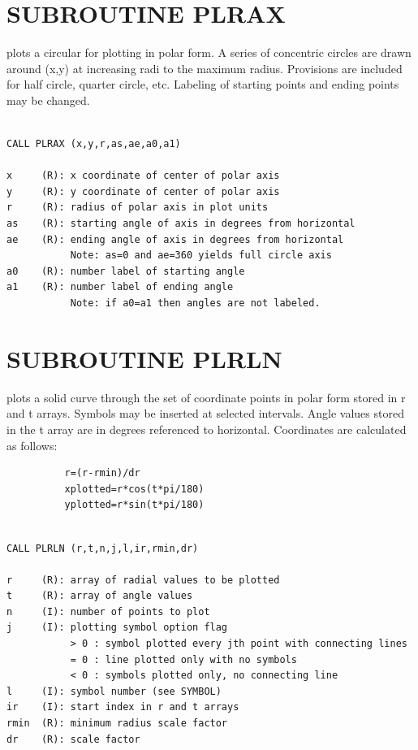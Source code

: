 \documentclass[11pt]{report}
\begin{document}
\section{SUBROUTINE PLRAX}

 plots a circular  for plotting in polar form.  A series
of concentric circles are drawn around (x,y) at increasing radi
to the maximum radius.     Provisions are included for half circle,
quarter circle, etc.  Labeling of starting points and ending points
may be changed.
\begin{verbatim}

CALL PLRAX (x,y,r,as,ae,a0,a1)

x     (R): x coordinate of center of polar axis
y     (R): y coordinate of center of polar axis
r     (R): radius of polar axis in plot units
as    (R): starting angle of axis in degrees from horizontal
ae    (R): ending angle of axis in degrees from horizontal
           Note: as=0 and ae=360 yields full circle axis
a0    (R): number label of starting angle
a1    (R): number label of ending angle
           Note: if a0=a1 then angles are not labeled.
\end{verbatim}

\section{SUBROUTINE PLRLN}

 plots a solid curve through the set of coordinate points
in polar form stored in r and t arrays.  Symbols may be inserted
at selected intervals.     Angle values stored in the t array are
in degrees referenced to horizontal.  Coordinates are calculated
as follows:
\begin{verbatim}
          r=(r-rmin)/dr
          xplotted=r*cos(t*pi/180)
          yplotted=r*sin(t*pi/180)

\end{verbatim}
\begin{verbatim}

CALL PLRLN (r,t,n,j,l,ir,rmin,dr)

r     (R): array of radial values to be plotted
t     (R): array of angle values
n     (I): number of points to plot
j     (I): plotting symbol option flag
           > 0 : symbol plotted every jth point with connecting lines
           = 0 : line plotted only with no symbols
           < 0 : symbols plotted only, no connecting line
l     (I): symbol number (see SYMBOL)
ir    (I): start index in r and t arrays
rmin  (R): minimum radius scale factor
dr    (R): scale factor
\end{verbatim}
\end{document}
